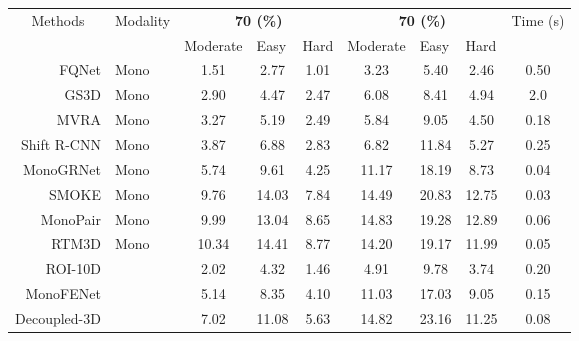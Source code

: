 \begin{table*}[ht!]
	\centering
	\resizebox{0.8\textwidth}{!}
	{\begin{tabular}{r| l c c c c c c c}
			\hline
			\multicolumn{1}{c}{\multirow{2}{*}{Methods}} & \multicolumn{1}{c}{\multirow{2}{*}{Modality}} & \multicolumn{3}{c}{\textbf{70 (\%)}} & \multicolumn{3}{c}{\textbf{70 (\%)}} & \multicolumn{1}{c}{\multirow{2}{*}{Time (s)}} \\
			\multicolumn{1}{c}{} & \multicolumn{1}{c}{} & \multicolumn{1}{l}{Moderate} & \multicolumn{1}{l}{Easy} & \multicolumn{1}{l}{Hard} & \multicolumn{1}{l}{Moderate} & \multicolumn{1}{l}{Easy} & \multicolumn{1}{l}{Hard} & \multicolumn{1}{c}{}\\ \hline
			FQNet \cite{liu2019deep}  & Mono  & 1.51 & 2.77 & 1.01 &  3.23 & 5.40 & 2.46 & 0.50\\
			GS3D \cite{li2019gs3d} & Mono  & 2.90 & 4.47 & 2.47 &  6.08  & 8.41 & 4.94 & 2.0\\
			MVRA  \cite{choi2019multi} & Mono  & 3.27 & 5.19 & 2.49 &  5.84  &  9.05 & 4.50 & 0.18\\	
			Shift R-CNN \cite{naiden2019shift} &Mono  & 3.87 & 6.88 & 2.83 &  6.82  & 11.84 & 5.27 & 0.25\\
MonoGRNet \cite{qin2019monogrnet} &Mono &5.74  &9.61 &	4.25 &  11.17   & 18.19 & 8.73 & 0.04\\	
SMOKE \cite{liu2020smoke} &Mono  & 9.76 & 14.03 &  7.84 & 14.49 & 20.83  &  12.75 & 0.03\\
			MonoPair \cite{chen2020monopair} &Mono  & 9.99 & 13.04 &  8.65 &14.83 & 19.28  &  12.89  & 0.06\\
			RTM3D \cite{li2020rtm3d} & Mono  & 10.34 & 14.41 & 8.77 & 14.20 & 19.17  &  11.99 & 0.05\\
			\hline
			ROI-10D \cite{manhardt2019roi} &   & 2.02 & 4.32 &	1.46 &  4.91  & 9.78 &	3.74 & 0.20\\
			MonoFENet \cite{bao2019monofenet} &   &5.14 & 8.35 &	4.10 &  11.03  & 17.03 & 9.05 & 0.15\\
			Decoupled-3D \cite{cai2020monocular} &  & 7.02 & 11.08 &  5.63 &14.82 & 23.16  &11.25 & 0.08\\ 
			

\end{tabular}}
\end{table*}
